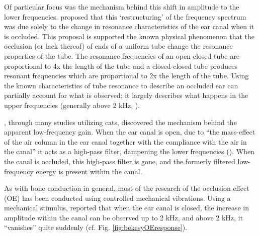\documentclass[dissertation,copyright]{uathesis}
\begin{document}
Of particular focus was the mechanism behind this shift in amplitude to the lower frequencies. \cite{huizing:60} proposed that this `restructuring' of the frequency spectrum was due solely to the change in resonance characteristics of the ear canal when it is occluded.  This proposal is supported the known physical phenomenon that the occlusion (or lack thereof) of ends of a uniform tube change the resonance properties of the tube. The resonance frequencies of an open-closed tube are proportional to 4x the length of the tube and a closed-closed tube produces resonant frequencies which are proportional to 2x the length of the tube.  Using the known characteristics of tube resonance to describe an occluded ear can partially account for what is observed; it largely describes what happens in the upper frequencies (generally above 2 kHz, \cite{stenfelt:03}).  

\cite{tonndorf:66}, through many studies utilizing cats,  discovered the mechanism behind the apparent low-frequency gain.  When the ear canal is open, due to ``the mass-effect of the air column in the ear canal together with the compliance with the air in the canal'' it acts as a high-pass filter, dampening the lower frequencies (\cite{stenfelt:03, 910}).  When the canal is occluded, this high-pass filter is gone, and the formerly filtered low-frequency energy is present within the canal.


 
As with bone conduction in general, most of the research of the occlusion effect (OE) has been conducted using controlled mechanical vibrations.  Using a mechanical stimulus, \cite{bekesy:60} reported that when the ear canal is closed, the increase in amplitude within the canal can be observed up to 2 kHz, and above 2 kHz, it ``vanishes'' quite suddenly (cf. Fig. \ref{fig:bekesyOEresponse}).
\end{document}
